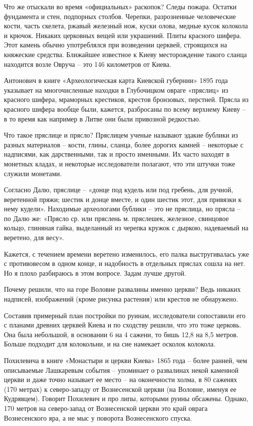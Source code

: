 Что же отыскали во время «официальных» раскопок? Следы пожара. Остатки фундамента и стен, подпорных столбов. Черепки, разрозненные человеческие кости, часть скелета, ржавый железный нож, куски олова, медные кусок колокола и крючок. Никаких церковных вещей или украшений. Плиты красного шифера. Этот камень обычно употреблялся при возведении церквей, строящихся на княжеские средства. Ближайшее известное к Киеву месторождение такого сланца находится возле Овруча – это 146 километров от Киева.

Антонович в книге «Археологическая карта Киевской губернии» 1895 года указывает на многочисленные находки в Глубочицком овраге «пряслиц» из красного шифера, мраморных крестиков, крестов бронзовых, перстней. Прясла из красного шифера вообще были, кажется, разбросаны по всему верхнему Киеву – в то время как например в Литве они были привозной редкостью.

Что такое пряслице и прясло? Пряслицем ученые называют эдакие бублики из разных материалов – кости, глины, сланца, более дорогих камней – некоторые с надписями, как дарственными, так и просто именными. Их часто находят в монетных кладах, и некоторые исследователи полагают, что эти штучки тоже служили монетами. 

Согласно Далю, пряслице – «донце под кудель или под гребень, для ручной, веретенной пряжи; шестик и донце вместе, и один шестик этот, для привязки к нему кудели». Находимые археологами бублики – это не пряслица, но прясла – по Далю же: «Прясло ср. или пряслень м. пряслешек, железное, свинцовое кольцо, глиняная гайка, выделанный из черепка кружок с дыркою, надеваемый на веретено, для весу».

Кажется, с течением времени веретено изменилось, его палка выстругивалась уже с противовесом в одном конце, и надобность в отдельных пряслах сошла на нет. Но я плохо разбираюсь в этом вопросе. Задам лучше другой.
 
Почему решили, что на горе Воловне развалины именно церкви? Ведь никаких надписей, изображений (кроме рисунка растения) или крестов не обнаружено.

Составив примерный план постройки по руинам, исследователи сопоставили его с планами древних церквей Киева и по сходству решили, что это тоже церковь. Она была небольшой, в основании 6 на 4 сажени, то бишь 12,8 на 8,5 метров. Больше подходит для колокольни, и на сие намекает осколок колокола.

Похилевича в книге «Монастыри и церкви Киева»\cite{pohilmon} 1865 года – более ранней, чем описываемые Лашкаревым события – упоминает о развалинах некой каменной церкви и даже точно называет ее место – на оконечности холма, в 80 саженях (170 метрах) к северо-западу от Вознесенской церкви (на Воловне, именуя ее Кудрявцем). Говорит Похилевич и про липы, которыми руины обсажены. Однако, 170 метров на северо-запад от Вознесенской церкви это край оврага Вознесенского яра, а не мыс у поворота Вознесенского спуска. 

